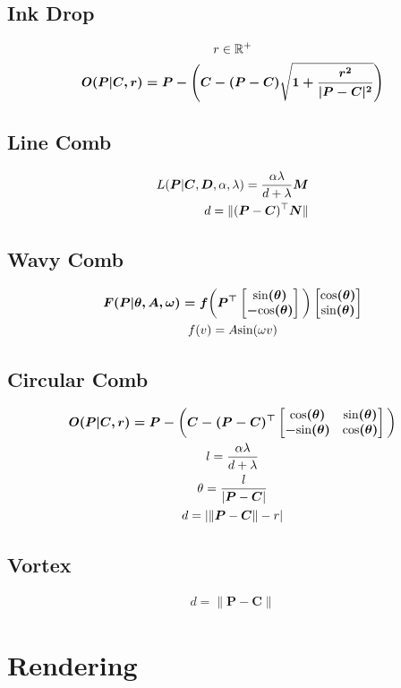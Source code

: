 \documentclass{article}
\newcommand{\Cb}{\boldsymbol{C}}
\newcommand{\Db}{\boldsymbol{D}}
\newcommand{\Mb}{\boldsymbol{M}}
\newcommand{\Nb}{\boldsymbol{N}}
\newcommand{\Pb}{\boldsymbol{P}}
\renewcommand{\sin}{\text{sin}}
\renewcommand{\cos}{\text{cos}}
\begin{document}
\subsection{Ink Drop}
\begin{gather*}
	r \in \mathbb{R}^+\\
	\boldmath{O}(\Pb | \Cb, r) =  \Pb - \Bigg(\Cb - (\Pb - \Cb )\sqrt{1 + \frac{r^2}{|\Pb - \Cb|^2}}\Bigg)
\end{gather*}

\subsection{Line Comb}
\begin{align*}
	\boldmath{L}(\Pb | \Cb, \Db, \alpha, \lambda) = \frac{\alpha\lambda}{d + \lambda}\Mb \\
    d = \lVert(\Pb - \Cb) ^ \top \Nb\rVert
\end{align*}

\subsection{Wavy Comb}
\begin{gather*}
	\boldmath{F}(\Pb| \theta, A, \omega) = f\bigg(\Pb^\top \begin{bmatrix}
	\sin(\theta)\\
	 -\cos(\theta)
	\end{bmatrix}\bigg) \begin{bmatrix}
	\cos(\theta)\\
	 \sin(\theta)
	\end{bmatrix}\\
    f(v) = A \sin(\omega v)
\end{gather*}

\subsection{Circular Comb}
\begin{gather*}
	\boldmath{O}(\Pb | \Cb, r) =  \Pb - \bigg(\Cb - (\Pb - \Cb) ^ \top \begin{bmatrix}
	\cos(\theta) &\sin(\theta)\\
	-\sin(\theta) &\cos(\theta)\\
	\end{bmatrix} \bigg)\\
	l = \frac{\alpha \lambda}{d + \lambda}\\
	\theta = \frac{l}{|\Pb - \Cb|}\\
    d = |\lVert \Pb - \Cb\rVert - r|
\end{gather*}

\subsection{Vortex}
\begin{gather*}
	d = \lVert\Pb - \Cb\rVert
\end{gather*}
\section{Rendering}



\end{document}
